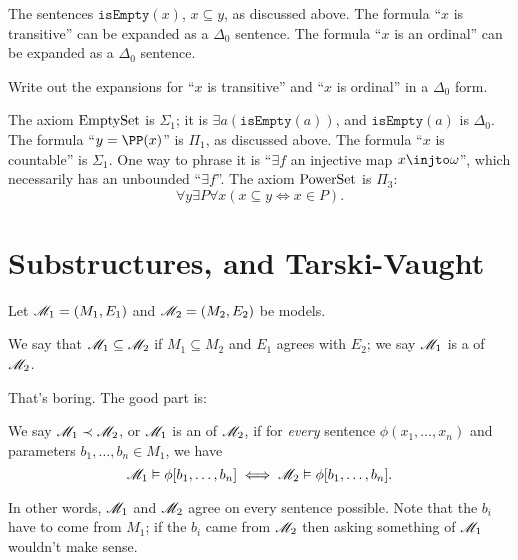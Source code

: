 \begin{example}
	\listhack
	\begin{enumerate}[(a)]
		\ii The sentences $\mathtt{isEmpty}(x)$, $x \subseteq y$, as discussed above.
		\ii The formula ``$x$ is transitive'' can be expanded as a $\Delta_0$ sentence.
		\ii The formula ``$x$ is an ordinal'' can be expanded as a $\Delta_0$ sentence.
	\end{enumerate}
\end{example}
\begin{exercise}
	Write out the expansions for ``$x$ is transitive'' and ``$x$ is ordinal''
	in a $\Delta_0$ form.
\end{exercise}
\begin{example}
	\listhack
	\begin{enumerate}[(a)]
		\ii The axiom $\mathrm{EmptySet}$ is $\Sigma_1$; it is $\exists a (\mathtt{isEmpty}(a))$,
		and $\mathtt{isEmpty}(a)$ is $\Delta_0$.
		\ii The formula ``$y = \PP(x)$'' is $\Pi_1$, as discussed above.
		\ii The formula ``$x$ is countable'' is $\Sigma_1$.
		One way to phrase it is ``$\exists f$ an injective map $x \injto \omega$'',
		which necessarily has an unbounded ``$\exists f$''.
		\ii The axiom $\mathrm{PowerSet}$ is $\Pi_3$:
		\[ \forall y \exists P \forall x (x\subseteq y \iff x \in P). \]
	\end{enumerate}
\end{example}

\section{Substructures, and Tarski-Vaught}
Let $\mathscr M_1 = (M_1, E_1)$ and $\mathscr M_2 = (M_2, E_2)$ be models.
\begin{definition}
	We say that $\mathscr M_1 \subseteq \mathscr M_2$ if $M_1 \subseteq M_2$ and
	$E_1$ agrees with $E_2$; we say $\mathscr M_1$ is a  of $\mathscr M_2$.
\end{definition}

That's boring. The good part is:
\begin{definition}
	We say $\mathscr M_1 \prec \mathscr M_2$, or $\mathscr M_1$ is an  of $\mathscr M_2$,
	if for \emph{every} sentence $\phi(x_1, \dots, x_n)$
	and parameters $b_1, \dots, b_n \in M_1$, we have
	\[
		\mathscr M_1 \vDash \phi[b_1, \dots, b_n] \iff
		\mathscr M_2 \vDash \phi[b_1, \dots, b_n].
	\]
\end{definition}
In other words, $\mathscr M_1$ and $\mathscr M_2$ agree on every sentence possible.
Note that the $b_i$ have to come from $M_1$; if the $b_i$ came from $\mathscr M_2$ then
asking something of $\mathscr M_1$ wouldn't make sense.

